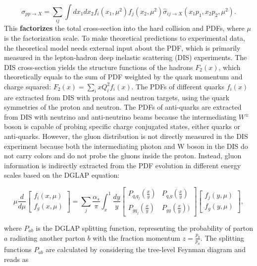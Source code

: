 \begin{equation}
    \sigma_{pp\to X } = \sum_{ij}\int dx_1 dx_2 f_i(x_1, \mu^2) f_j(x_2, \mu^2) \hat{\sigma}_{ij\to X } (x_1 p_1, x_2 p_2,\mu^2) .
    \label{eqn:relatedWorks:qft:ppCollision:factorization}
\end{equation}
\noindent This \textbf{factorizes} the total cross-section into the hard collision and PDFs, where $\mu$ is the factorization scale. To make theoretical predictions to experimental data, the theoretical model needs external input about the PDF, which is primarily measured in the lepton-hadron deep inelastic scattering (DIS) experiments. The DIS cross-section yields the structure functions of the hadrons $F_2(x)$, which theoretically equals to the sum of PDF weighted by the quark momentum and charge squared: $F_2(x) = \sum_i x Q^2_i f_i(x)$. The PDFs of different quarks $f_i(x)$ are extracted from DIS with protons and neutron targets, using the quark symmetries of the proton and neutron. The PDFs of anti-quarks are extracted from DIS with neutrino and anti-neutrino beams because the intermediating $W^\pm$ boson is capable of probing specific charge conjugated states, either quarks or anti-quarks. However, the gluon distribution is not directly measured in the DIS experiment because both the intermediating photon and W boson in the DIS do not carry colors and do not probe the gluons inside the proton. Instead, gluon information is indirectly extracted from the PDF evolution in different energy scales based on the DGLAP equation:

\begin{equation}
    \mu \frac{d}{d\mu} \begin{bmatrix} f_i(x,\mu) \\ f_g(x,\mu) \end{bmatrix} = 
    \sum_j \frac{\alpha_s}{\pi} \int_x^1 
    \frac{dy}{y}
    \begin{bmatrix} P_{q_i q_j}(\frac{x}{y}) & P_{q_i g}(\frac{x}{y}) \\ P_{g q_j}(\frac{x}{y}) & P_{gg}(\frac{x}{y})) \end{bmatrix} \begin{bmatrix} f_j(y,\mu) \\ f_g(y,\mu) \end{bmatrix} ,
    \label{eqn:relatedWorks:qft:ppCollision:dglap}
\end{equation}

\noindent where $P_{ab}$ is the DGLAP splitting function, representing the probability of parton $a$ radiating another parton $b$ with the fraction momentum $z=\frac{p_b}{p_a}$. The splitting  functions $P_{ab}$ are calculated by considering the tree-level Feynman diagram and reads as

